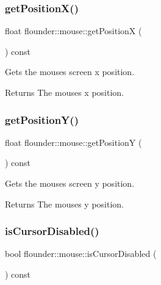 \subsubsection{\texorpdfstring{get\+Position\+X()}{getPositionX()}}
{\footnotesize\ttfamily float flounder\+::mouse\+::get\+PositionX (\begin{DoxyParamCaption}{ }\end{DoxyParamCaption}) const\hspace{0.3cm}{\ttfamily [inline]}}



Gets the mouses screen x position. 

\begin{DoxyReturn}{Returns}
The mouses x position. 
\end{DoxyReturn}
\mbox{\label{classflounder_1_1mouse_a2c3c2c739ac356bfdc10b05bf8ad526a}} 
\subsubsection{\texorpdfstring{get\+Position\+Y()}{getPositionY()}}
{\footnotesize\ttfamily float flounder\+::mouse\+::get\+PositionY (\begin{DoxyParamCaption}{ }\end{DoxyParamCaption}) const\hspace{0.3cm}{\ttfamily [inline]}}



Gets the mouses screen y position. 

\begin{DoxyReturn}{Returns}
The mouses y position. 
\end{DoxyReturn}
\mbox{\label{classflounder_1_1mouse_a21ab748aa15cd2b0c565bac54e4aa013}} 
\subsubsection{\texorpdfstring{is\+Cursor\+Disabled()}{isCursorDisabled()}}
{\footnotesize\ttfamily bool flounder\+::mouse\+::is\+Cursor\+Disabled (\begin{DoxyParamCaption}{ }\end{DoxyParamCaption}) const\hspace{0.3cm}{\ttfamily [inline]}}



